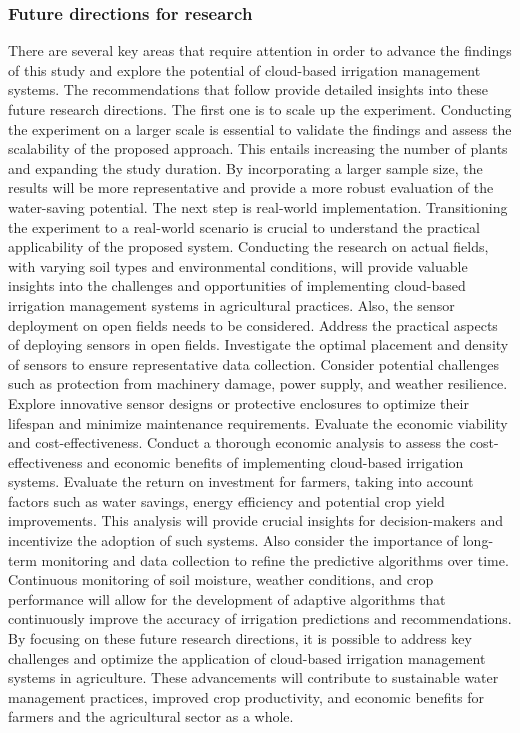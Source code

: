 \documentclass[11pt]{scrartcl} %
\begin{document}
\subsubsection{Future directions for research}
There are several key areas that require attention in order to advance the findings of this study and explore the potential of cloud-based irrigation management systems. The recommendations that follow provide detailed insights into these future research directions.
\newline The first one is to scale up the experiment. Conducting the experiment on a larger scale is essential to validate the findings and assess the scalability of the proposed approach. This entails increasing the number of plants and expanding the study duration. By incorporating a larger sample size, the results will be more representative and provide a more robust evaluation of the water-saving potential.
\newline The next step is real-world implementation. Transitioning the experiment to a real-world scenario is crucial to understand the practical applicability of the proposed system. Conducting the research on actual fields, with varying soil types and environmental conditions, will provide valuable insights into the challenges and opportunities of implementing cloud-based irrigation management systems in agricultural practices.
\newline Also, the sensor deployment on open fields needs to be considered. Address the practical aspects of deploying sensors in open fields. Investigate the optimal placement and density of sensors to ensure representative data collection. Consider potential challenges such as protection from machinery damage, power supply, and weather resilience. Explore innovative sensor designs or protective enclosures to optimize their lifespan and minimize maintenance requirements.
\newline Evaluate the economic viability and cost-effectiveness. Conduct a thorough economic analysis to assess the cost-effectiveness and economic benefits of implementing cloud-based irrigation systems. Evaluate the return on investment for farmers, taking into account factors such as water savings, energy efficiency and potential crop yield improvements. This analysis will provide crucial insights for decision-makers and incentivize the adoption of such systems.
\newline Also consider the importance of long-term monitoring and data collection to refine the predictive algorithms over time. Continuous monitoring of soil moisture, weather conditions, and crop performance will allow for the development of adaptive algorithms that continuously improve the accuracy of irrigation predictions and recommendations.
\newline By focusing on these future research directions, it is possible to address key challenges and optimize the application of cloud-based irrigation management systems in agriculture. These advancements will contribute to sustainable water management practices, improved crop productivity, and economic benefits for farmers and the agricultural sector as a whole.
\end{document}
